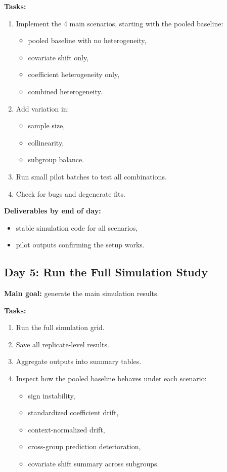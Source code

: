 \documentclass[11pt]{article}
\begin{document}
\textbf{Tasks:}
\begin{enumerate}[label=(\arabic*)]
    \item Implement the 4 main scenarios, starting with the pooled baseline:
    \begin{itemize}
        \item pooled baseline with no heterogeneity,
        \item covariate shift only,
        \item coefficient heterogeneity only,
        \item combined heterogeneity.
    \end{itemize}
    \item Add variation in:
    \begin{itemize}
        \item sample size,
        \item collinearity,
        \item subgroup balance.
    \end{itemize}
    \item Run small pilot batches to test all combinations.
    \item Check for bugs and degenerate fits.
\end{enumerate}

\textbf{Deliverables by end of day:}
\begin{itemize}
    \item stable simulation code for all scenarios,
    \item pilot outputs confirming the setup works.
\end{itemize}

\subsection*{Day 5: Run the Full Simulation Study}
\textbf{Main goal:} generate the main simulation results.

\textbf{Tasks:}
\begin{enumerate}[label=(\arabic*)]
    \item Run the full simulation grid.
    \item Save all replicate-level results.
    \item Aggregate outputs into summary tables.
    \item Inspect how the pooled baseline behaves under each scenario:
    \begin{itemize}
        \item sign instability,
        \item standardized coefficient drift,
        \item context-normalized drift,
        \item cross-group prediction deterioration,
        \item covariate shift summary across subgroups.
    \end{itemize}
\end{enumerate}
\end{document}
